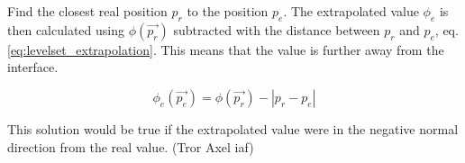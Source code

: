 Find the closest real position $p_r$ to the position $p_e$. The extrapolated value $\phi_e$ is then calculated using $\phi(\vec{p_r})$ subtracted with the distance between $p_r$ and $p_e$, eq. \ref{eq:levelset_extrapolation}. This means that the value is further away from the interface. 

\begin{equation}
\label{eq:levelset_extrapolation}
\phi_e(\vec{p_e}) =  \phi(\vec{p_r}) - \left | p_r - p_e  \right |
\end{equation} 

This solution would be true if the extrapolated value were in the negative normal direction from the real value. (Tror Axel iaf)